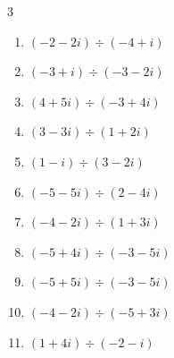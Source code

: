 \begin{multicols}{3}
\begin{enumerate}

  \item $\displaystyle (-2-2i)\div(-4+i)$


  \item $\displaystyle (-3+i)\div(-3-2i)$


  \item $\displaystyle (4+5i)\div(-3+4i)$


  \item $\displaystyle (3-3i)\div(1+2i)$


  \item $\displaystyle (1-i)\div(3-2i)$


  \item $\displaystyle (-5-5i)\div(2-4i)$


\columnbreak %

  \item $\displaystyle (-4-2i)\div(1+3i)$

        \phantom{$\displaystyle =-1+i$}

  \item $\displaystyle (-5+4i)\div(-3-5i)$


  \item $\displaystyle (-5+5i)\div(-3-5i)$


  \item $\displaystyle (-4-2i)\div(-5+3i)$


  \item $\displaystyle (1+4i)\div(-2-i)$



\end{enumerate}
\end{multicols}

